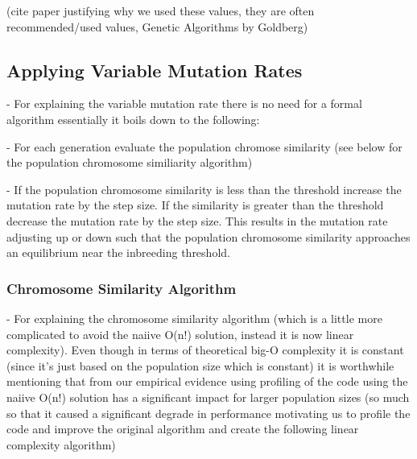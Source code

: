 \documentclass{sig-alternate}
\begin{document}
(cite paper justifying why we used these values, they are often recommended/used values, Genetic Algorithms by Goldberg)


\subsection{Applying Variable Mutation Rates}

- For explaining the variable mutation rate there is no need for a formal algorithm
  essentially it boils down to the following:

  - For each generation evaluate the population chromose similarity (see below
    for the population chromosome similiarity algorithm)

  - If the population chromosome similarity is less than the threshold increase
    the mutation rate by the step size. If the similarity is greater than the
    threshold decrease the mutation rate by the step size. This results in
    the mutation rate adjusting up or down such that the population chromosome
    similarity approaches an equilibrium near the inbreeding threshold.




\subsubsection{Chromosome Similarity Algorithm}

- For explaining the chromosome similarity algorithm (which is a little more
  complicated to avoid the naiive O(n!) solution, instead it is now linear
  complexity). Even though in terms of theoretical big-O complexity it is
  constant (since it's just based on the population size which is constant) it
  is worthwhile mentioning that from our empirical evidence using profiling of
  the code using the naiive O(n!) solution has a significant impact for larger
  population sizes (so much so that it caused a significant degrade in performance
  motivating us to profile the code and improve the original algorithm and create
  the following linear complexity algorithm)\cite{bowman:reasoning}
\end{document}

